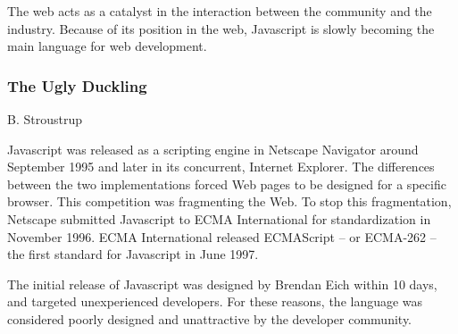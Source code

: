 The web acts as a catalyst in the interaction between the community and the industry.
Because of its position in the web, Java\-script is slowly becoming the main language for web development.


\subsubsection{The Ugly Duckling}

%
{B. Stroustrup}



Java\-script was released as a scripting engine in Netscape Navigator around September 1995 and later in its concurrent, Internet Explorer.
The differences between the two implementations forced Web pages to be designed for a specific browser.
This competition was fragmenting the Web.
To stop this fragmentation, Netscape submitted Java\-script to ECMA International for standardization in November 1996.
ECMA International released  ECMAScript -- or ECMA-262 -- the first standard for Java\-script in June 1997. %

The initial release of Java\-script was designed by Brendan Eich within 10 days, and targeted unexperienced developers.
For these reasons, the language was considered poorly designed and unattractive by the developer community.



